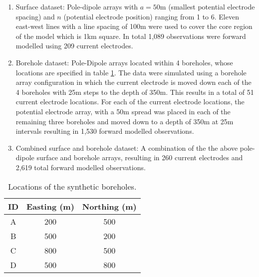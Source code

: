 \begin{enumerate}
\item Surface dataset: Pole-dipole arrays with $a=50$m (smallest potential electrode spacing) and $n$ (potential electrode position) ranging from 1 to 6. Eleven east-west lines with a line spacing of 100m were used to cover the core region of the model which is 1km square. In total 1,089 observations were forward modelled using 209 current electrodes.
\item Borehole dataset: Pole-Dipole arrays located within 4 boreholes, whose locations are specified in table \ref{tabl:BHloc}. The data were simulated using a borehole array configuration in which the current electrode is moved down each of the 4 boreholes with 25m steps to the depth of 350m. This results in a total of 51 current electrode locations. For each of the current electrode locations, the potential electrode array, with a 50m spread was placed in each of the remaining three boreholes and moved down to a depth of 350m at 25m intervals resulting in 1,530 forward modelled observations.
\item Combined surface and borehole dataset: A combination of the the above pole-dipole surface and borehole arrays, resulting in 260 current electrodes and 2,619 total forward modelled observations.
\end{enumerate}

\begin{table}[ht]
\centering
\begin{tabular}{|c|c|c|}
\hline
ID & Easting (m) & Northing (m) \\
\hline
A & 200 & 500 \\
\hline
B & 500 & 200 \\
\hline
C & 800 & 500 \\
\hline
D & 500 & 800 \\
\hline
\end{tabular}
\caption{Locations of the synthetic boreholes.}
\label{tabl:BHloc}
\end{table}

